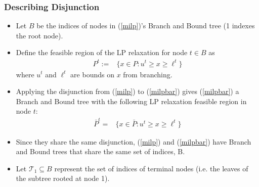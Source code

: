 \documentclass{beamer}
\begin{document}
	\begin{frame}[t]
		\frametitle{Describing Disjunction}
		\small
		\begin{itemize}
			\item Let $ B $ be the indices of nodes in (\ref{milp})'s Branch and Bound tree (1 indexes the root node).
			\item Define the feasible region of the LP relaxation for node $ t \in B $ as
			\begin{align*}
				P^{t} :=& \{x \in P: u^{t} \geq x \geq \ell^{t} \}
			\end{align*}
			where $ u^{t} $ and $ \ell^{t} $ are bounds on $ x $ from branching.
			\item Applying the disjunction from (\ref{milp}) to (\ref{milpbar}) gives (\ref{milpbar}) a Branch and Bound tree with the following LP relaxation feasible region in node $ t $:
			\begin{align*}
				\bar{P}^{t} =& \{x \in \bar{P}: u^{t} \geq x \geq \ell^{t} \}
			\end{align*}
			\item Since they share the same disjunction, (\ref{milp}) and (\ref{milpbar}) have Branch and Bound trees that share the same set of indices, B.
			\item Let $ \mathcal{T}_1 \subseteq B $ represent the set of indices of terminal nodes (i.e. the leaves of the subtree rooted at node 1).
		\end{itemize}
		\normalsize
	\end{frame}
\end{document}
